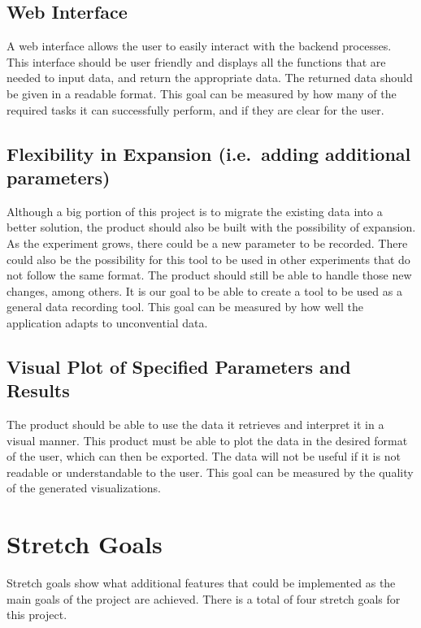 \documentclass{article}
\begin{document}
\subsection{Web Interface}
A web interface allows the user to easily interact with the backend processes.
This interface should be user friendly and displays all the functions that are
needed to input data, and return the appropriate data. The returned data should
be given in a readable format. This goal can be measured by how many of the
required tasks it can successfully perform, and if they are clear for the user.

\subsection{Flexibility in Expansion (i.e.\ adding additional parameters)}
Although a big portion of this project is to migrate the existing data into a
better solution, the product should also be built with the possibility of
expansion. As the experiment grows, there could be a new parameter to be
recorded. There could also be the possibility for this tool to be used in other
experiments that do not follow the same format. The product should still be able
to handle those new changes, among others. It is our goal to be able to create a
tool to be used as a general data recording tool. This goal can be measured by
how well the application adapts to unconvential data.

\subsection{Visual Plot of Specified Parameters and Results}
The product should be able to use the data it retrieves and interpret it in a
visual manner. This product must be able to plot the data in the desired format
of the user, which can then be exported. The data will not be useful if it is
not readable or understandable to the user. This goal can be measured by the
quality of the generated visualizations.

\section{Stretch Goals}
Stretch goals show what additional features that could be implemented as the
main goals of the project are achieved. There is a total of four stretch goals
for this project.
\end{document}
